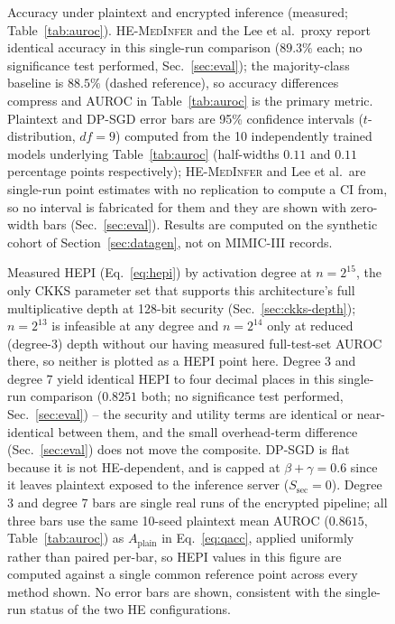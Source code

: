 \documentclass[journal,compsoc]{IEEEtran}
\newcommand{\HEPI}{\textsc{HEPI}}          %
\newcommand{\framework}{\textsc{HE-MedInfer}}
\begin{document}
\begin{figure}[!t]
\caption{Accuracy under plaintext and encrypted inference (measured;
Table~\ref{tab:auroc}). \framework{} and the Lee et al.\ proxy report
identical accuracy in this single-run comparison ($89.3\%$ each; no
significance test performed, Sec.~\ref{sec:eval}); the majority-class baseline
is $88.5\%$ (dashed reference), so accuracy differences compress and AUROC
in Table~\ref{tab:auroc} is the primary metric. Plaintext and DP-SGD error
bars are 95\% confidence intervals ($t$-distribution, $df=9$) computed from
the 10 independently trained models underlying Table~\ref{tab:auroc}
(half-widths $0.11$ and $0.11$ percentage points respectively); \framework{}
and Lee et al.\ are single-run point estimates with no replication to
compute a CI from, so no interval is fabricated for them and they are shown
with zero-width bars (Sec.~\ref{sec:eval}). Results are
computed on the synthetic cohort of Section~\ref{sec:datagen}, not on
MIMIC-III records.}
\label{fig:performance}

\end{figure}

\begin{figure}[!t]
\caption{Measured \HEPI{} (Eq.~\eqref{eq:hepi}) by activation degree at
$n=2^{15}$, the only CKKS parameter set that supports this architecture's
full multiplicative depth at 128-bit security (Sec.~\ref{sec:ckks-depth});
$n=2^{13}$ is infeasible at any degree and $n=2^{14}$ only at reduced
(degree-3) depth without our having measured full-test-set AUROC there, so
neither is plotted as a HEPI point here. Degree 3 and degree 7 yield
identical \HEPI{} to four decimal places in this single-run comparison
($0.8251$ both; no significance test performed, Sec.~\ref{sec:eval}) --
the security and utility terms are identical or near-identical between them,
and the small overhead-term difference (Sec.~\ref{sec:eval}) does not move
the composite. DP-SGD is flat because it is not HE-dependent, and is capped
at $\beta + \gamma = 0.6$ since it leaves plaintext exposed to the
inference server ($S_{\mathrm{sec}} = 0$). Degree 3 and degree 7 bars are
single real runs of the encrypted pipeline; all three bars use the same
10-seed plaintext mean AUROC ($0.8615$, Table~\ref{tab:auroc}) as
$A_{\mathrm{plain}}$ in Eq.~\eqref{eq:qacc}, applied uniformly rather than
paired per-bar, so \HEPI{} values in this figure are computed against a
single common reference point across every method shown. No error bars
are shown, consistent with the single-run status of the two HE
configurations.}
\label{fig:security}

\end{figure}
\end{document}
